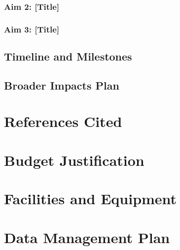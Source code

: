\documentclass[11pt]{article}
\begin{document}
\subsubsection{Aim 2: [Title]}

\subsubsection{Aim 3: [Title]}

\subsection{Timeline and Milestones}

\subsection{Broader Impacts Plan}

\section{References Cited}



\section{Budget Justification}

\section{Facilities and Equipment}

\section{Data Management Plan}
\end{document}
